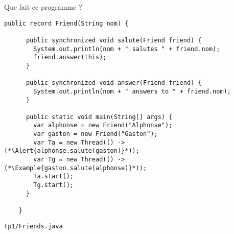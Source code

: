 
\begingroup

\begin{frame}[fragile]{Que fait ce programme ?}

  \begin{lstlisting}[gobble=2]
    public record Friend(String nom) {
      
      public synchronized void salute(Friend friend) {
        System.out.println(nom + " salutes " + friend.nom);
        friend.answer(this);
      }
      
      public synchronized void answer(Friend friend) {
        System.out.println(nom + " answers to " + friend.nom);
      }
      
      public static void main(String[] args) {
        var alphonse = new Friend("Alphonse");
        var gaston = new Friend("Gaston");
        var Ta = new Thread(() -> (*\Alert{alphonse.salute(gaston)}*));
        var Tg = new Thread(() -> (*\Example{gaston.salute(alphonse)}*));
        Ta.start();
        Tg.start();
      }
      
    }
  \end{lstlisting}
  
  \begin{citing}
    \jitem \lstinline{tp1/Friends.java}
  \end{citing}
\end{frame}

\endgroup
\endinput
